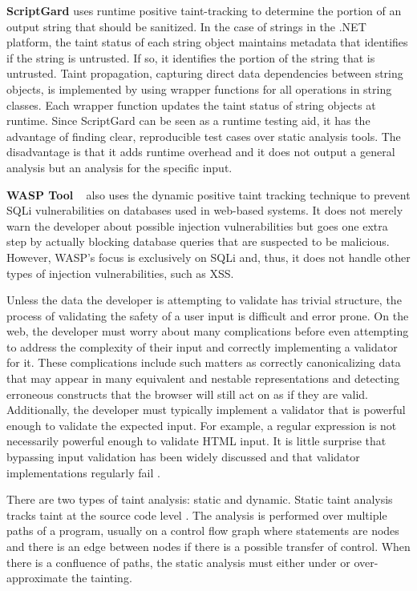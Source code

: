 \textbf{ScriptGard} \cite{scriptgard} uses runtime positive taint-tracking to determine the portion of
an output string that should be sanitized. In the case of strings
in the .NET platform, the taint status of each string object maintains
metadata that identifies if the string is untrusted. If so, it identifies
the portion of the string that is untrusted. Taint propagation, capturing
direct data dependencies between string objects, is implemented by
using wrapper functions for all operations in string classes. Each
wrapper function updates the taint status of string objects at runtime.
Since ScriptGard can be seen as a runtime testing aid, it has the
advantage of finding clear, reproducible test cases over static analysis
tools. The disadvantage is that it adds runtime overhead and it does not output a general analysis but an analysis for the specific input.

\textbf{WASP Tool} ~\cite{wasp} also uses the dynamic positive taint tracking technique to prevent SQLi vulnerabilities on databases used in web-based systems. It does not merely warn the developer about possible injection vulnerabilities but goes one extra step by actually blocking database queries that are suspected to be malicious. However, WASP's focus is exclusively on SQLi and, thus, it does not handle other types of injection vulnerabilities, such as XSS.


Unless the data the developer is attempting to validate has trivial
structure, the process of validating the safety of a user input is
difficult and error prone. On the web, the developer must worry about
many complications before even attempting to address the complexity
of their input and correctly implementing a validator for it. These
complications include such matters as correctly canonicalizing data
that may appear in many equivalent and nestable representations and
detecting erroneous constructs that the browser will still act on
as if they are valid. Additionally, the developer must typically implement a validator that is powerful enough to validate the expected input. For example, a regular expression is not necessarily powerful enough to validate HTML input. It is little surprise that bypassing input validation
has been widely discussed \cite{validationbypass1,validationbypass2} and that
validator implementations regularly fail \cite{validationexploit1, validationexploit2, validationexploit3}.

There are two types of taint analysis: static and dynamic. Static taint analysis tracks taint at
the source code level \cite{static_taint_taj, static_taint_wassermann, static_taint_sridharan}. The analysis is performed
over multiple paths of a program, usually on a control flow graph
where statements are nodes and there is an edge between nodes if there
is a possible transfer of control. When there is a confluence of paths,
the static analysis must either under or over-approximate the tainting.

